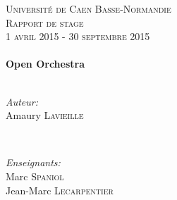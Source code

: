 \begin{titlepage}


\center %


\textsc{\LARGE Université de Caen Basse-Normandie}\\[1.5cm] %

\textsc{\Large Rapport de stage}\\[0.5cm] %
\textsc{1 avril 2015 - 30 septembre 2015}\\[0.5cm] %



\HRule \\[0.4cm]

{ \huge \bfseries Open Orchestra}\\[0.4cm] %

\HRule \\[1.5cm]


\begin{minipage}{0.4\textwidth}
\begin{flushleft} \large
\emph{Auteur:}\\

Amaury \textsc{Lavieille}

\end{flushleft}
\end{minipage}
~
\begin{minipage}{0.4\textwidth}
\begin{flushright} \large
\emph{Enseignants:} \\
Marc \textsc{Spaniol}\\
Jean-Marc \textsc{Lecarpentier}
\end{flushright}
\end{minipage}\\[4cm]


\end{titlepage}
